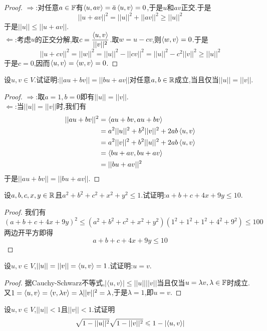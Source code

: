 \documentclass{ctexart}
\begin{document}
\begin{proof}
    $\Rightarrow$:对任意$a\in\mathbb{F}$有$\left\langle{u},{av}\right\rangle=\bar{a}\left\langle{u},{v}\right\rangle=0$,于是$u$和$av$正交.于是
    \[||u+av||^2=||u||^2+||av||^2\geqslant||u||^2\]
    于是$||u||\leqslant||u+av||$.\\
    $\Leftarrow$:考虑$u$的正交分解,取$c=\dfrac{\left\langle{u},{v}\right\rangle}{||v||^2}$.取$w=u-cv$,则$\left\langle{w},{v}\right\rangle=0$.于是
    \[||u+cv||^2=||w||^2=||u||^2-||cv||^2=||u||^2-c^2||v||^2\geqslant||u||^2\]
    于是$c=0$,因而$\left\langle{u},{v}\right\rangle=\left\langle{w},{v}\right\rangle=0$.
\end{proof}
\begin{problem}[7.]
    设$u,v\in V$.试证明:$||au+bv||=||bu+av||$对任意$a,b\in\mathbb{R}$成立,当且仅当$||u||=||v||$.
\end{problem}
\begin{proof}
    $\Rightarrow$:取$a=1,b=0$即有$||u||=||v||$.\\
    $\Leftarrow$:当$||u||=||v||$时,我们有
    \[\begin{aligned}
        ||au+bv||^2
        &= \left\langle{au+bv},{au+bv}\right\rangle \\
        &= a^2||u||^2+b^2||v||^2+2ab\left\langle{u},{v}\right\rangle \\
        &= a^2||v||^2+b^2||u||^2+2ab\left\langle{u},{v}\right\rangle \\
        &= \left\langle{bu+av},{bu+av}\right\rangle \\
        &= ||bu+av||^2
    \end{aligned}\]
    于是$||au+bv||=||bu+av||$.
\end{proof}
\begin{problem}[8.]
    设$a,b,c,x,y\in\mathbb{R}$且$a^2+b^2+c^2+x^2+y^2\leqslant1$.试证明:$a+b+c+4x+9y\leqslant10$.
\end{problem}
\begin{proof}
    我们有
    \[(a+b+c+4x+9y)^2\leqslant(a^2+b^2+c^2+x^2+y^2)(1^2+1^2+1^2+4^2+9^2)\leqslant100\]
    两边开平方即得\[a+b+c+4x+9y\leqslant10\]
\end{proof}
\begin{problem}[9.]
    设$u,v\in V$,$||u||=||v||=\left\langle{u},{v}\right\rangle=1$.试证明:$u=v$.
\end{problem}
\begin{proof}
    据Cauchy-Schwarz不等式,$|\langle u,v\rangle|\leqslant||u||||v||$当且仅当$u=\lambda v,\lambda\in\mathbb{F}$时成立.\\
    又$1=\left\langle{u},{v}\right\rangle=\left\langle{v},{\lambda v}\right\rangle=\lambda||v||^2=\lambda$,于是$\lambda=1$,即$u=v$.
\end{proof}
\begin{problem}[10.]
    设$u,v\in V$,$||u||<1$且$||v||<1$.试证明
    \[\sqrt{1-||u||^2}\sqrt{1-||v||^2}\leqslant1-\left|\left\langle{u},{v}\right\rangle\right|\]
\end{problem}
\end{document}

